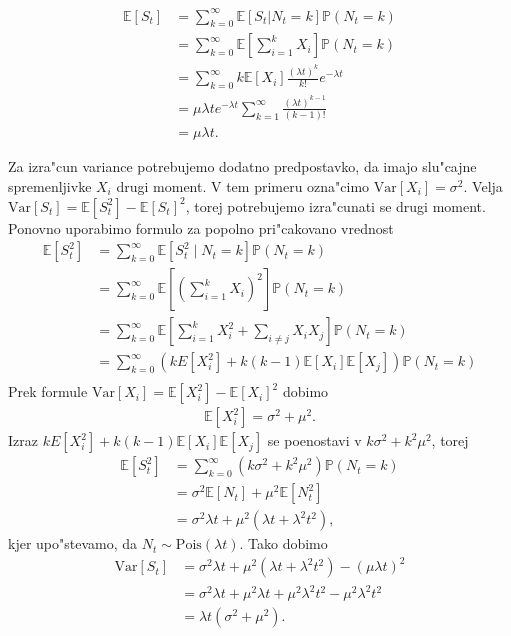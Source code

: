 \documentclass[12pt,a4paper]{amsart}
\theoremstyle{definition} %
\theoremstyle{plain} %
\newcommand{\E}{\mathbb{E}}
\newcommand{\Prob}{\mathbb{P}}
\newcommand{\1}{\mathds{1}}
\newcommand{\Pois}[1]{\text{Pois}(#1)}
\newcommand{\Var}[1]{\text{Var}\left[#1\right]}
\begin{document}
    \begin{align*}
        \E\left[S_t\right] &= \sum_{k=0}^{\infty} \E\left[S_t | N_t = k\right] \Prob\left(N_t = k\right)\\
                           &= \sum_{k=0}^{\infty} \E\left[\sum_{i=1}^{k} X_i\right] \Prob\left(N_t = k\right)\\
                           &= \sum_{k=0}^{\infty}k\E\left[X_i\right]\frac{(\lambda t)^k}{k!}e^{-\lambda t}\\
                           &= \mu\lambda te^{-\lambda t}\sum_{k=1}^{\infty}\frac{(\lambda t)^{k-1}}{(k-1)!}\\
                           &= \mu\lambda t.
    \end{align*}

    \noindent
    Za izra"cun variance potrebujemo dodatno predpostavko, da imajo slu"cajne spremenljivke $X_i$ 
    drugi moment. V tem primeru ozna"cimo $\Var{X_i} = \sigma^2$. Velja 
    $\Var{S_t} = \E\left[S_t^2\right] - \E\left[S_t\right]^2$, torej potrebujemo izra"cunati se 
    drugi moment. Ponovno uporabimo formulo za popolno pri"cakovano vrednost
    \begin{align*}
        \E\left[S_t^2\right] 
                &= \sum_{k=0}^\infty\E\left[S_t^2\mid N_t = k\right]\Prob\left(N_t=k\right) \\
                &= \sum_{k=0}^\infty\E\left[\left(\sum_{i=1}^kX_i\right)^2\right]\Prob\left(N_t=k\right)\\
                &= \sum_{k=0}^\infty\E\left[\sum_{i=1}^kX_i^2 + \sum_{i\neq j}X_iX_j\right]\Prob\left(N_t=k\right)\\
                &= \sum_{k=0}^\infty\left(kE\left[X_i^2\right] 
                    +k(k-1)\E\left[X_i\right]\E\left[X_j\right]\right)\Prob\left(N_t=k\right)\\
    \end{align*}
    Prek formule $\Var{X_i} = \E\left[X_i^2\right] - \E\left[X_i\right]^2$ dobimo
    \begin{align*}
        \E\left[X_i^2\right] = \sigma^2 + \mu^2.
    \end{align*}
    Izraz $kE\left[X_i^2\right]+k(k-1)\E\left[X_i\right]\E\left[X_j\right]$ se poenostavi v 
    $k\sigma^2 + k^2\mu^2$, torej 
    \begin{align*}
        \E\left[S_t^2\right] 
                &= \sum_{k=0}^\infty\left(k\sigma^2 + k^2\mu^2\right)\Prob\left(N_t=k\right)\\
                &= \sigma^2\E\left[N_t\right] + \mu^2\E\left[N_t^2\right]\\
                &= \sigma^2\lambda t + \mu^2(\lambda t + \lambda^2t^2),
    \end{align*}
    kjer upo"stevamo, da $N_t \sim \Pois{\lambda t}$. Tako dobimo
    \begin{align*}
        \Var{S_t} 
                &= \sigma^2\lambda t + \mu^2(\lambda t + \lambda^2t^2) - (\mu\lambda t)^2 \\
                &= \sigma^2\lambda t + \mu^2\lambda t + \mu^2\lambda^2t^2 - \mu^2\lambda^2t^2\\
                &= \lambda t\left(\sigma^2 + \mu^2\right).
    \end{align*}
\end{document}
